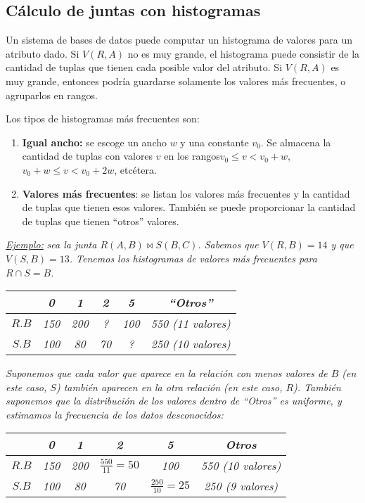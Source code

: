 \documentclass[a4paper, twoside]{article}
\begin{document}
\subsection{Cálculo de juntas con histogramas}
Un sistema de bases de datos puede computar un histograma de valores para un atributo dado. Si $V(R,A)$ no es muy grande, el histograma puede consistir de la cantidad de tuplas que tienen cada posible valor del atributo. Si $V(R,A)$ es muy grande, entonces podría guardarse solamente los valores más frecuentes, o agruparlos en rangos.

Los tipos de histogramas más frecuentes son:
\begin{enumerate}
	\item \textbf{Igual ancho:} se escoge un ancho $w$ y una constante $v_{0}$. Se almacena la cantidad de tuplas con valores $v$ en los rangos\emph{$v_{0}\leq v<v_{0}+w,$ $v_{0}+w\leq v<v_{0}+2w$}, etcétera.
	\item \textbf{Valores más frecuentes}: se listan los valores más frecuentes y la cantidad de tuplas que tienen esos valores. También se puede proporcionar la cantidad de tuplas que tienen ``otros'' valores.
\end{enumerate}

\emph{\uline{Ejemplo:}} \emph{sea la junta $R(A,B)\bowtie S(B,C)$. Sabemos que $V(R,B)=14$ y que $V(S,B)=13$. Tenemos los histogramas de valores más frecuentes para $R\cap S=B$.}

\begin{center}
	\begin{tabular}{|c|c|c|c|c|c|}
		\hline 
		 & \emph{0} & \emph{1} & \emph{2} & \emph{5} & \emph{``Otros''}\\
		\hline 
		\hline 
		\emph{$R.B$} & \emph{150} & \emph{200} & \emph{?} & \emph{100} & \emph{550 (11 valores)}\\
		\hline 
		\emph{$S.B$} & \emph{100} & \emph{80} & \emph{70} & \emph{?} & \emph{250 (10 valores)}\\
		\hline 
	\end{tabular}
\end{center}

\emph{Suponemos que cada valor que aparece en la relación con menos valores de $B$ (en este caso, $S$) también aparecen en la otra relación (en este caso, $R$). También suponemos que la distribución de los valores dentro de ``Otros'' es uniforme, y estimamos la frecuencia de los datos desconocidos:}

\begin{center}
	\begin{tabular}{|c|c|c|c|c|c|}
		\hline 
		 & \emph{0} & \emph{1} & \emph{2} & \emph{5} & \emph{Otros}\\
		\hline 
		\hline 
		\emph{$R.B$} & \emph{150} & \emph{200} & \emph{$\frac{550}{11}=50$} & \emph{100} & \emph{550 (10 valores)}\\
		\hline 
		\emph{$S.B$} & \emph{100} & \emph{80} & \emph{70} & \emph{$\frac{250}{10}=25$} & \emph{250 (9 valores)}\\
		\hline 
	\end{tabular}
\end{center}
\end{document}
